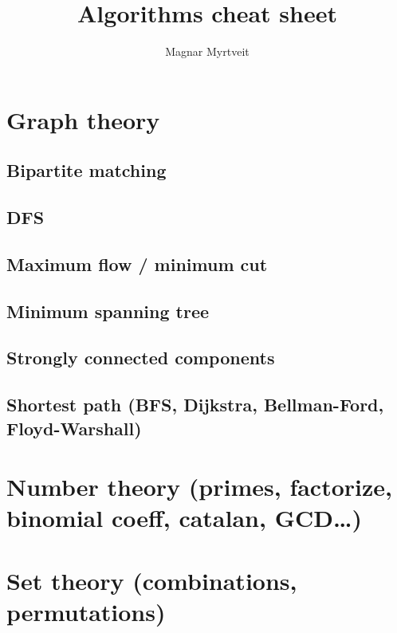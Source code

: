 \documentclass[a4paper, 11pt]{article}
\title{Algorithms cheat sheet}
\author{Magnar Myrtveit}
\def\path{..}
\begin{document}
\maketitle
\tableofcontents

\clearpage
\section{Graph theory}
\subsection{Bipartite matching}


\clearpage
\subsection{DFS}


\clearpage
\subsection{Maximum flow / minimum cut}


\clearpage
\subsection{Minimum spanning tree}


\clearpage
\subsection{Strongly connected components}


\clearpage
\subsection{Shortest path (BFS, Dijkstra, Bellman-Ford, Floyd-Warshall)}


\clearpage
\section{Number theory (primes, factorize, binomial coeff, catalan, GCD\dots)}


\clearpage
\section{Set theory (combinations, permutations)}

\end{document}
